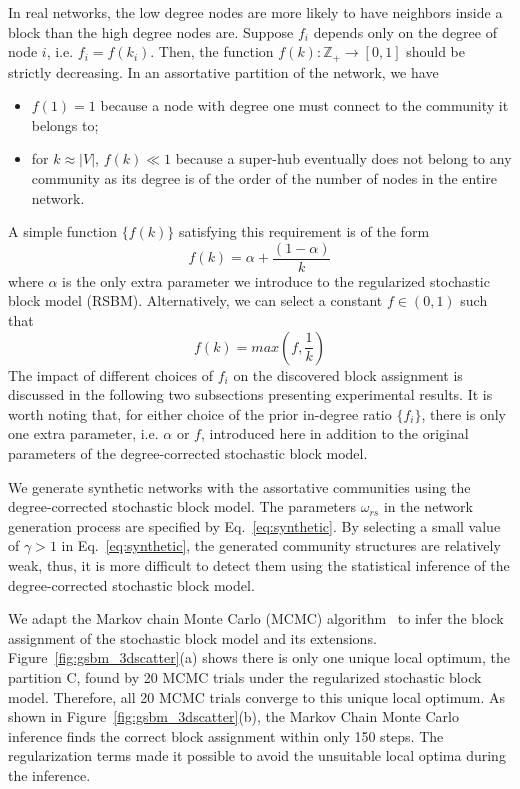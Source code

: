 In real networks, the low degree nodes are more likely to have neighbors inside a block than the high degree nodes are. Suppose $f_i$ depends only on the degree of node $i$, i.e. $f_i = f(k_i)$. Then, the function $f(k): \mathbb Z_+ \to [0, 1] $ should be strictly decreasing. In an assortative partition of the network, we have
\begin{itemize}
    \item $f(1) = 1$ because a node with degree one must connect to the community it belongs to;
    \item for $k\approx |V|$, $f(k) \ll 1$ because a super-hub eventually does not belong to any community as its degree is of the order of the number of nodes in the entire network.
\end{itemize}
A simple function $\{f(k)\}$ satisfying this requirement is of the form
\begin{equation}
  f(k) = \alpha + \frac{(1 - \alpha)}{k}
\end{equation}
where $\alpha$ is the only extra parameter we introduce to the regularized stochastic block model (RSBM). Alternatively, we can select a constant $f\in(0,1)$  such that  
\begin{equation}
    f(k)= max(f, \frac{1}{k})
\end{equation}
The impact of different choices of $f_i$ on the discovered block assignment is discussed in the following two subsections presenting experimental results. It is worth noting that, for either choice of the prior in-degree ratio $\{f_i\}$, there is only one extra parameter, i.e. $\alpha$ or $f$, introduced here in addition to the original parameters of the degree-corrected stochastic block model.

We generate synthetic networks with the assortative communities using the degree-corrected stochastic block model. The parameters $\omega_{rs}$ in the network generation process are specified by Eq.~\ref{eq:synthetic}. By selecting a small value of $\gamma > 1$ in Eq.~\ref{eq:synthetic}, the generated community structures are relatively weak, thus, it is more difficult to detect them using the statistical inference of the degree-corrected stochastic block model.

We adapt the Markov chain Monte Carlo (MCMC) algorithm~\cite{nasrabadi2007pattern} to infer the block assignment of the stochastic block model and its extensions. Figure~\ref{fig:gsbm_3dscatter}(a) shows there is only one unique local optimum, the partition C, found by 20 MCMC trials under the regularized stochastic block model. Therefore, all 20 MCMC trials converge to this unique local optimum. As shown in Figure~\ref{fig:gsbm_3dscatter}(b), the Markov Chain Monte Carlo inference finds the correct block assignment within only 150 steps. The regularization terms made it possible to avoid the unsuitable local optima during the inference.


